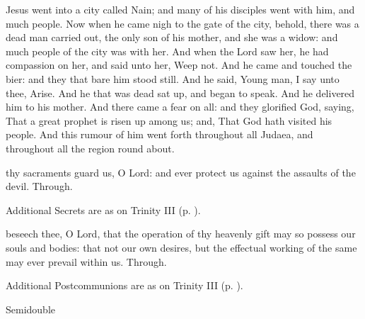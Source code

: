  Jesus went into a city called Nain; and many of his disciples went with him, and much people. Now when he came nigh to the gate of the city, behold, there was a dead man carried out, the only son of his mother, and she was a widow: and much people of the city was with her. And when the Lord saw her, he had compassion on her, and said unto her, Weep not. And he came and touched the bier: and they that bare him stood still. And he said, Young man, I say unto thee, Arise. And he that was dead sat up, and began to speak. And he delivered him to his mother. And there came a fear on all: and they glorified God, saying, That a great prophet is risen up among us; and, That God hath visited his people. And this rumour of him went forth throughout all Judaea, and throughout all the region round about.


\secret
{} thy sacraments guard us, O Lord: and ever protect us against the assaults of the devil. Through.
\begin{rubric}
    Additional Secrets are as on Trinity III (p. \pageref{TrinityIII}).
\end{rubric}


\postcommunion
{} beseech thee, O Lord, that the operation of thy heavenly gift may so possess our souls and bodies: that not our own desires, but the effectual working of the same may ever prevail within us. Through.
\begin{rubric}
    Additional Postcommunions are as on Trinity III (p. \pageref{TrinityIII}).
\end{rubric}

\begin{inhead}
{Semidouble}
\end{inhead}
\par\noindent
{}

